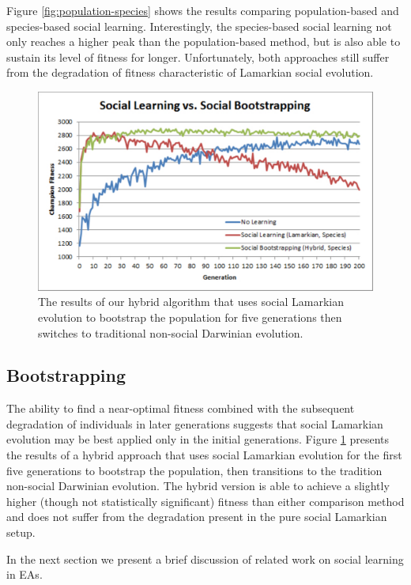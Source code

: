 \documentclass{acm_proc_article-sp}
\begin{document}
Figure \ref{fig:population-species} shows the results comparing population-based and species-based social learning. Interestingly, the species-based social learning not only reaches a higher peak than the population-based method, but is also able to sustain its level of fitness for longer. Unfortunately, both approaches still suffer from the degradation of fitness characteristic of Lamarkian social evolution.

\begin{figure}
  \centering
    \includegraphics[scale=.35]{learning_bootstrapping.pdf}
  \caption{The results of our hybrid algorithm that uses social Lamarkian evolution to bootstrap the population for five generations then switches to traditional non-social Darwinian evolution.}
  \label{fig:learning-bootstrapping}
\end{figure}

\subsection*{Bootstrapping}
The ability to find a near-optimal fitness combined with the subsequent degradation of individuals in later generations suggests that social Lamarkian evolution may be best applied only in the initial generations. Figure \ref{fig:learning-bootstrapping} presents the results of a hybrid approach that uses social Lamarkian evolution for the first five generations to bootstrap the population, then transitions to the tradition non-social Darwinian evolution. The hybrid version is able to achieve a slightly higher (though not statistically significant) fitness than either comparison method and does not suffer from the degradation present in the pure social Lamarkian setup.

In the next section we present a brief discussion of related work on social learning in EAs.
 
\end{document}
